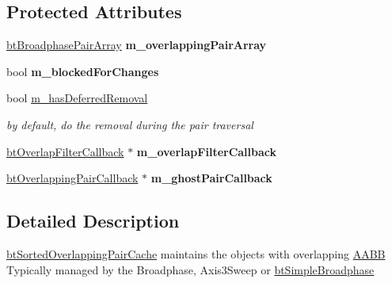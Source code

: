 \subsection*{Protected Attributes}
\begin{DoxyCompactItemize}
\item 
\mbox{\label{classbtSortedOverlappingPairCache_acaa927894c7124575a41316d29ff9d3b}} 
\hyperlink{classbtAlignedObjectArray}{bt\+Broadphase\+Pair\+Array} {\bfseries m\+\_\+overlapping\+Pair\+Array}
\item 
\mbox{\label{classbtSortedOverlappingPairCache_a20f04b05ae9f4fe1fcaed54b5738fc5c}} 
bool {\bfseries m\+\_\+blocked\+For\+Changes}
\item 
\mbox{\label{classbtSortedOverlappingPairCache_aaf79926dc15005b65c34248053af42b9}} 
bool \hyperlink{classbtSortedOverlappingPairCache_aaf79926dc15005b65c34248053af42b9}{m\+\_\+has\+Deferred\+Removal}
\begin{DoxyCompactList}\small\item\em by default, do the removal during the pair traversal \end{DoxyCompactList}\item 
\mbox{\label{classbtSortedOverlappingPairCache_a2596026b0c5a62884b8738bcba309e1b}} 
\hyperlink{structbtOverlapFilterCallback}{bt\+Overlap\+Filter\+Callback} $\ast$ {\bfseries m\+\_\+overlap\+Filter\+Callback}
\item 
\mbox{\label{classbtSortedOverlappingPairCache_a78b677aaadc5f2b69eb2bc4668d8efd3}} 
\hyperlink{classbtOverlappingPairCallback}{bt\+Overlapping\+Pair\+Callback} $\ast$ {\bfseries m\+\_\+ghost\+Pair\+Callback}
\end{DoxyCompactItemize}


\subsection{Detailed Description}
\hyperlink{classbtSortedOverlappingPairCache}{bt\+Sorted\+Overlapping\+Pair\+Cache} maintains the objects with overlapping \hyperlink{classAABB}{A\+A\+BB} Typically managed by the Broadphase, Axis3\+Sweep or \hyperlink{classbtSimpleBroadphase}{bt\+Simple\+Broadphase} 

